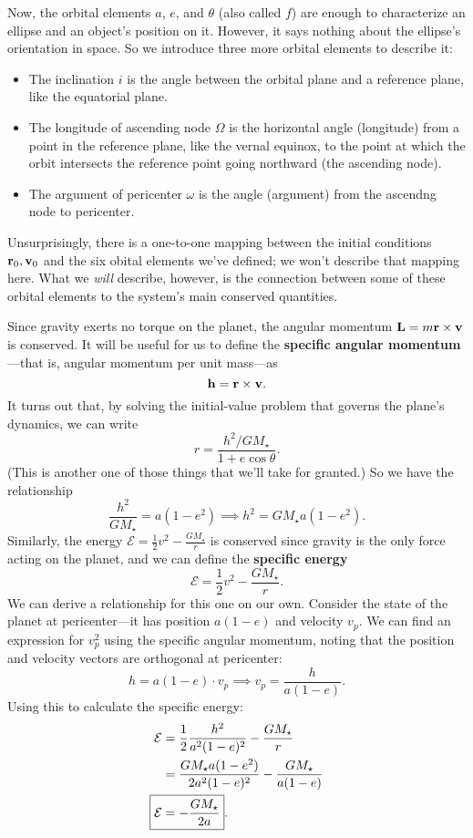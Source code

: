 \documentclass[../a062main.tex]{subfiles}
\begin{document}
Now, the orbital elements $a$, $e$, and $\theta$ (also called $f$) are enough to characterize an ellipse and an object's position on it.
However, it says nothing about the ellipse's orientation in space.
So we introduce three more orbital elements to describe it:
\begin{itemize}
    \item The inclination $i$ is the angle between the orbital plane and a reference plane, like the equatorial plane.
    \item The longitude of ascending node $\Omega$ is the horizontal angle (longitude) from a point in the reference plane, like the vernal equinox, to the point at which the orbit intersects the reference point going northward (the ascending node).
    \item The argument of pericenter $\omega$ is the angle (argument) from the ascendng node to pericenter.
\end{itemize}
Unsurprisingly, there is a one-to-one mapping between the initial conditions $\mathbf{r}_0, \mathbf{v}_0$ and the six obital elements we've defined; we won't describe that mapping here.
What we \textit{will} describe, however, is the connection between some of these orbital elements to the system's main conserved quantities.

Since gravity exerts no torque on the planet, the angular momentum $\mathbf{L} = m \mathbf{r} \times \mathbf{v}$ is conserved.
It will be useful for us to define the \textbf{specific angular momentum}---that is, angular momentum per unit mass---as
\[ \mathbf{h} = \mathbf{r} \times \mathbf{v}. \]
It turns out that, by solving the initial-value problem that governs the plane's dynamics, we can write
\[ r = \frac{h^2/GM_\star}{1 + e \cos \theta}. \]
(This is another one of those things that we'll take for granted.)
So we have the relationship
\[ \frac{h^2}{GM_\star} = a (1 - e^2) \implies \boxed{h^2 = GM_\star a (1 - e^2)}. \]
Similarly, the energy $\mathcal{E} = \frac{1}{2}v^2 - \frac{GM_\star}{r}$ is conserved since gravity is the only force acting on the planet, and we can define the \textbf{specific energy}
\[ \mathcal{E} = \frac{1}{2}v^2 - \frac{GM_\star}{r}. \]
We can derive a relationship for this one on our own.
Consider the state of the planet at pericenter---it has position $a(1 - e)$ and velocity $v_p$.
We can find an expression for $v_p^2$ using the specific angular momentum, noting that the position and velocity vectors are orthogonal at pericenter:
\[ h = a (1 - e) \cdot v_p \implies v_p = \frac{h}{a (1 - e)}. \]
Using this to calculate the specific energy:
\begin{align*}
    \mathcal{E} &= \frac{1}{2} \frac{h^2}{a^2 (1-e)^2} - \frac{GM_\star}{r} \\
    &= \frac{GM_\star a (1 - e^2)}{2a^2 (1-e)^2} - \frac{GM_\star}{a (1-e)} \\
    \Aboxed{\mathcal{E} &= -\frac{GM_\star}{2a}}.
\end{align*}
\end{document}
